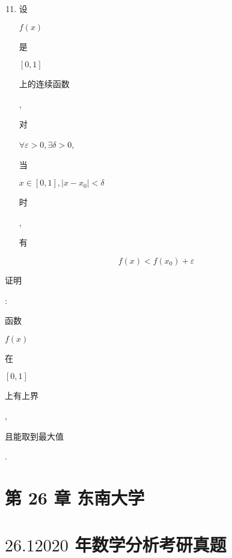 \documentclass[10pt]{article}
\begin{document}
\begin{enumerate}
  \setcounter{enumi}{10}
  \item \begin{CJK}{UTF8}{mj}设\end{CJK} $f(x)$ \begin{CJK}{UTF8}{mj}是\end{CJK} $[0,1]$ \begin{CJK}{UTF8}{mj}上的连续函数\end{CJK}, \begin{CJK}{UTF8}{mj}对\end{CJK} $\forall \varepsilon>0, \exists \delta>0$, \begin{CJK}{UTF8}{mj}当\end{CJK} $x \in[0,1],\left|x-x_{0}\right|<\delta$ \begin{CJK}{UTF8}{mj}时\end{CJK}, \begin{CJK}{UTF8}{mj}有\end{CJK}
\end{enumerate}
$$
f(x)<f\left(x_{0}\right)+\varepsilon
$$
\begin{CJK}{UTF8}{mj}证明\end{CJK}: \begin{CJK}{UTF8}{mj}函数\end{CJK} $f(x)$ \begin{CJK}{UTF8}{mj}在\end{CJK} $[0,1]$ \begin{CJK}{UTF8}{mj}上有上界\end{CJK}, \begin{CJK}{UTF8}{mj}且能取到最大值\end{CJK}.

\section{第 26 章 东南大学}
\section{$26.12020$ 年数学分析考研真题}
\end{document}
